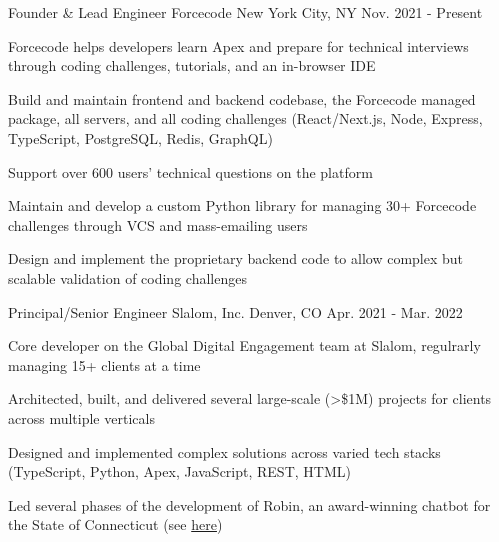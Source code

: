 \begin{cventries}
  \cventry
    {Founder \& Lead Engineer} %
    {Forcecode} %
    {New York City, NY} %
    {Nov. 2021 - Present} %
    {
      \begin{cvitems} %
        \item {Forcecode helps developers learn Apex and prepare for technical interviews through coding challenges, tutorials, and an in-browser IDE}
        \item {Build and maintain frontend and backend codebase, the Forcecode managed package, all servers, and all coding challenges (React/Next.js, Node, Express, TypeScript, PostgreSQL, Redis, GraphQL)}
        \item {Support over 600 users' technical questions on the platform}
        \item {Maintain and develop a custom Python library for managing 30+ Forcecode challenges through VCS and mass-emailing users}
        \item {Design and implement the proprietary backend code to allow complex but scalable validation of coding challenges}
      \end{cvitems}
    }


  \cventry
    {Principal/Senior Engineer} %
    {Slalom, Inc.} %
    {Denver, CO} %
    {Apr. 2021 - Mar. 2022} %
    {
      \begin{cvitems} %
        \item {Core developer on the Global Digital Engagement team at Slalom, regulrarly managing 15+ clients at a time}
        \item {Architected, built, and delivered several large-scale (>\$1M) projects for clients across multiple verticals}
        \item {Designed and implemented complex solutions across varied tech stacks (TypeScript, Python, Apex, JavaScript, REST, HTML)}
        \item {Led several phases of the development of Robin, an award-winning chatbot for the State of Connecticut (see \href{https://portal.ct.gov/das/dasblog/das-team-wins-government-experience-award}{\color{awesome-skyblue}here})}
      \end{cvitems}
    }


\end{cventries}
